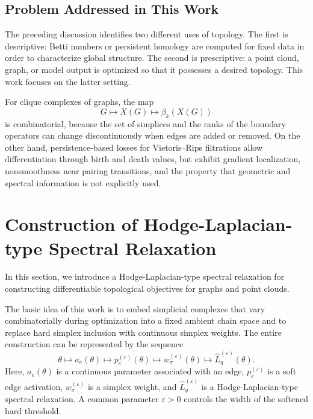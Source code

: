 \documentclass[pdflatex,sn-mathphys-num]{sn-jnl}%
\theoremstyle{thmstyleone}%
\theoremstyle{thmstyletwo}%
\theoremstyle{thmstylethree}%
\begin{document}
\subsection[Problem Addressed in This Work]{Problem Addressed in This Work}

The preceding discussion identifies two different uses of topology.
The first is descriptive: Betti numbers or persistent homology are computed for fixed data in order to characterize global structure.
The second is prescriptive: a point cloud, graph, or model output is optimized so that it possesses a desired topology.
This work focuses on the latter setting.

For clique complexes of graphs, the map
\[
G
\longmapsto
X(G)
\longmapsto
\beta_k(X(G))
\]
is combinatorial, because the set of simplices and the ranks of the boundary operators can change discontinuously when edges are added or removed.
On the other hand, persistence-based losses for Vietoris--Rips filtrations allow differentiation through birth and death values, but exhibit gradient localization, nonsmoothness near pairing transitions, and the property that geometric and spectral information is not explicitly used.






\section{Construction of Hodge-Laplacian-type Spectral Relaxation}

In this section, we introduce a Hodge-Laplacian-type spectral relaxation for constructing differentiable topological objectives for graphs and point clouds.

The basic idea of this work is to embed simplicial complexes that vary combinatorially during optimization into a fixed ambient chain space and to replace hard simplex inclusion with continuous simplex weights. The entire construction can be represented by the sequence
\[
\theta
\longmapsto
a_e(\theta)
\longmapsto
p_e^{(\varepsilon)}(\theta)
\longmapsto
w_\sigma^{(\varepsilon)}(\theta)
\longmapsto
\widehat L_q^{(\varepsilon)}(\theta).
\]
Here, \(a_e(\theta)\) is a continuous parameter associated with an edge, \(p_e^{(\varepsilon)}\) is a soft edge activation, \(w_\sigma^{(\varepsilon)}\) is a simplex weight, and \(\widehat L_q^{(\varepsilon)}\) is a Hodge-Laplacian-type spectral relaxation. A common parameter \(\varepsilon>0\) controls the width of the softened hard threshold.
\end{document}
